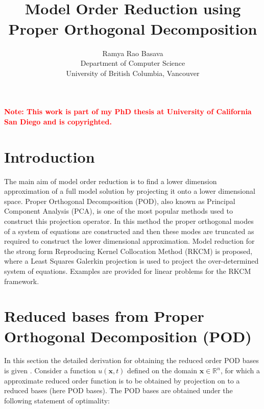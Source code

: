 \documentclass[10pt,letterpaper, onecolumn]{article}
\title{\vspace{-3cm}
\noindent\makebox[\linewidth]{\rule{0.9\textwidth}{2.0pt}} \\ 
\textbf{Model Order Reduction using Proper Orthogonal Decomposition} \\
\vspace{-0.30cm}
\noindent\makebox[\linewidth]{\rule{0.9\textwidth}{0.5pt}}}
\author{Ramya Rao Basava\\
Department of Computer Science\\
University of British Columbia, Vancouver}
\date{}
\begin{document}
\maketitle

\textcolor{red}{\textbf{Note: This work is part of my PhD thesis at University of California San Diego and is copyrighted.}}

\section{Introduction}
The main aim of model order reduction is to find a lower dimension approximation of a full model solution by projecting it onto a lower dimensional space. Proper Orthogonal Decomposition (POD), also known as Principal Component Analysis (PCA), is one of the most popular methods used to construct this projection operator. In this method the proper orthogonal modes of a system of equations are constructed and then these modes are truncated as required to construct the lower dimensional approximation. Model reduction for the strong form Reproducing Kernel Collocation Method (RKCM) \cite{hu2011error} is proposed, where a Least Squares Galerkin projection is used to project the over-determined system of equations. Examples are provided for linear problems for the RKCM framework.

\section{Reduced bases from Proper Orthogonal Decomposition (POD)}
\label{section7.1}
In this section the detailed derivation for obtaining the reduced order POD bases is given \cite{ philipbook2012turbulence, kerschen2005method}.
Consider a function $u(\bm{x},t)$ defined on the domain $\bm{x} \in \mathbb{R}^n$, for which a approximate reduced order function is to be obtained by projection on to a reduced bases (here POD bases). The POD bases are obtained under the following statement of optimality: 
\end{document}
